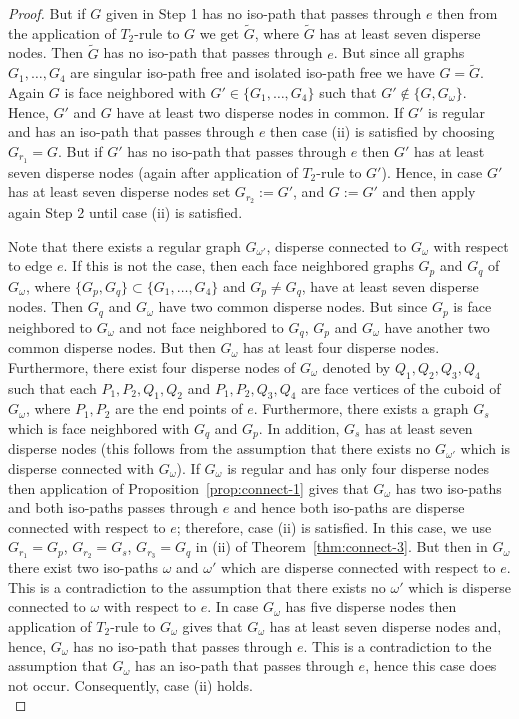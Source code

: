 \documentclass[a4paper,11pt]{article}
\begin{document}
\begin{proof}
 But if $G$ given in Step 1 has no iso-path that passes through $e$ then from the
application of $T_2$-rule to $G$ we get $\tilde{G}$, where $\tilde{G}$ has at least seven disperse nodes.
Then $\tilde{G}$ has no iso-path that passes through $e$. But since all graphs $G_1,\ldots,G_4$ are
singular iso-path free and isolated iso-path free we have $G=\tilde{G}$. Again $G$ is face neighbored
with $G'\in\{G_1,\ldots,G_4\}$ such that $G'\notin\{G,G_{\omega}\}$. Hence, $G'$ and $G$ have at least
two disperse nodes in common. If $G'$ is regular and has an iso-path that passes through $e$ then case
(ii) is satisfied by choosing $G_{r_1}=G$. But if $G'$ has no iso-path that passes through $e$ then
$G'$ has at least seven disperse nodes (again after application of $T_2$-rule to $G'$). Hence, in
case $G'$ has at least seven disperse nodes set $G_{r_2}:=G'$, and $G:=G'$ and then apply again
Step 2 until case (ii) is satisfied.

Note that there exists a
regular graph $G_{\omega'}$, disperse connected to $G_{\omega}$ with respect to edge $e$. If this is
not the case, then each face neighbored graphs $G_p$ and $G_q$ of $G_{\omega}$, where
$\{G_p,G_q\}\subset\{G_1,\ldots,G_4\}$ and $G_p\neq G_q$, have at least seven disperse nodes.
Then $G_q$ and $G_{\omega}$ have two common disperse nodes. But since $G_p$ is face neighbored
to $G_{\omega}$ and not face neighbored to $G_q$, $G_p$ and $G_{\omega}$ have another two common
disperse nodes. But then $G_{\omega}$ has at least four disperse nodes. Furthermore, there exist
four disperse nodes of $G_{\omega}$ denoted by $Q_1,Q_2,Q_3,Q_4$ such that each $P_1,P_2,Q_1,Q_2$
and $P_1,P_2,Q_3,Q_4$ are face vertices of the cuboid of $G_{\omega}$, where $P_1,P_2$ are the end points
of $e$. Furthermore, there exists a graph $G_s$ which is face neighbored with $G_q$ and $G_p$. In
addition,  $G_s$ has at least seven disperse nodes (this follows from the assumption that there exists
no $G_{\omega'}$ which is disperse connected with $G_{\omega}$). If $G_{\omega}$ is regular and has
only four disperse nodes then application of Proposition~\ref{prop:connect-1} gives that $G_{\omega}$
has two iso-paths and both iso-paths passes through $e$ and hence both iso-paths are disperse connected
with respect to $e$; therefore, case (ii) is satisfied. In this case,
we use $G_{r_1}=G_p$, $G_{r_2}=G_s$,  $G_{r_3}=G_q$ in (ii) of Theorem~\ref{thm:connect-3}. But then
in $G_{\omega}$ there exist two iso-paths $\omega$ and $\omega'$ which are disperse connected
with respect to $e$. This is a contradiction to the assumption that there exists no
$\omega'$ which is disperse connected to $\omega$ with respect to $e$. In case $G_{\omega}$ has
five disperse nodes then application of $T_2$-rule to $G_{\omega}$ gives that $G_{\omega}$ has at
least seven disperse nodes and, hence, $G_{\omega}$ has no iso-path that passes through $e$. This is
a contradiction to the assumption that $G_{\omega}$ has an iso-path that passes through
$e$, hence this case does not occur. Consequently, case (ii) holds.\\


\end{proof}
\end{document}
